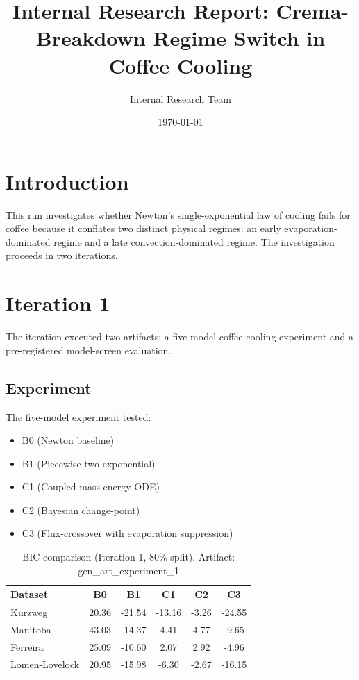 \documentclass{article}
\title{Internal Research Report: Crema-Breakdown Regime Switch in Coffee Cooling}
\author{Internal Research Team}
\date{\today}
\begin{document}
\maketitle
\tableofcontents

\section{Introduction}
This run investigates whether Newton's single-exponential law of cooling fails for coffee because it conflates two distinct physical regimes: an early evaporation-dominated regime and a late convection-dominated regime. The investigation proceeds in two iterations.

\section{Iteration 1}
The iteration executed two artifacts: a five-model coffee cooling experiment and a pre-registered model-screen evaluation.

\subsection{Experiment}
The five-model experiment tested:
\begin{itemize}
    \item B0 (Newton baseline)
    \item B1 (Piecewise two-exponential)
    \item C1 (Coupled mass-energy ODE)
    \item C2 (Bayesian change-point)
    \item C3 (Flux-crossover with evaporation suppression)
\end{itemize}

\begin{table}[!htbp]
\centering
\caption{BIC comparison (Iteration 1, 80\% split). Artifact: gen\_art\_experiment\_1}
\label{tab:bic_iter1}
\begin{tabular}{lccccc}
\toprule
Dataset & B0 & B1 & C1 & C2 & C3 \\
\midrule
Kurzweg & 20.36 & -21.54 & -13.16 & -3.26 & -24.55 \\
Manitoba & 43.03 & -14.37 & 4.41 & 4.77 & -9.65 \\
Ferreira & 25.09 & -10.60 & 2.07 & 2.92 & -4.96 \\
Lomen-Lovelock & 20.95 & -15.98 & -6.30 & -2.67 & -16.15 \\
\bottomrule
\end{tabular}
\end{table}
\end{document}
